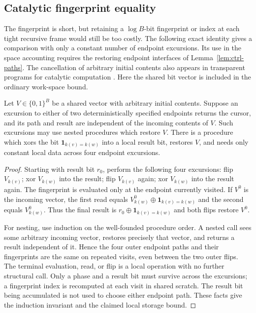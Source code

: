 \subsection{Catalytic fingerprint equality}

The fingerprint is short, but retaining a $\log B$-bit fingerprint or index at each tight
recursive frame would still be too costly.  The following exact
identity gives a comparison with only a constant number of endpoint
excursions.  Its use in the space accounting requires the restoring
endpoint interfaces of Lemma~\ref{lem:ctrl-paths}.
The cancellation of arbitrary initial contents also appears in
transparent programs for catalytic computation
\cite[Section~3]{BuhrmanCleveKouckyLoffSpeelman2014}.  Here the shared bit
vector is included in the ordinary work-space bound.

\begin{lemma}\label{lem:fp-catalytic}
Let $V\in\{0,1\}^B$ be a shared vector with arbitrary initial contents.
Suppose an excursion to either of two deterministically specified
endpoints returns the cursor, and its path and result are independent
of the incoming contents of $V$.  Such excursions may use nested
procedures which restore $V$.  There is a procedure which xors the bit
$\mathbf1_{k(v)=k(w)}$ into a local result bit, restores $V$, and needs
only constant local data across four endpoint excursions.
\end{lemma}

\begin{proof}
Starting with result bit $r_0$, perform the following four excursions:
flip $V_{k(v)}$; xor $V_{k(w)}$ into the result; flip $V_{k(v)}$ again;
xor $V_{k(w)}$ into the result again.  The fingerprint is evaluated only at the
endpoint currently visited.  If $V^0$ is the incoming vector, the first
read equals $V^0_{k(w)}\mathbin\oplus\mathbf1_{k(v)=k(w)}$ and the
second equals $V^0_{k(w)}$.  Thus the final result is
$r_0\mathbin\oplus\mathbf1_{k(v)=k(w)}$ and both flips restore $V^0$.

For nesting, use induction on the well-founded procedure order.  A
nested call sees some arbitrary incoming vector, restores precisely
that vector, and returns a result independent of it.  Hence the four
outer endpoint paths and their fingerprints are the same on repeated visits,
even between the two outer flips.  The terminal evaluation, read, or
flip is a local operation with no further structural call.  Only a
phase and a result bit must survive across the excursions; a fingerprint index
is recomputed at each visit in shared scratch.  The result bit being
accumulated is not used to choose either endpoint path.  These facts
give the induction invariant and the claimed local storage bound.
\end{proof}

